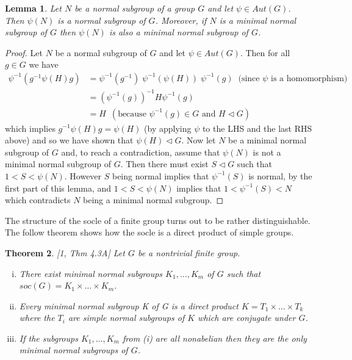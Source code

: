 \documentclass[]{article}
\newtheorem{thm}{Theorem}[section]
\newtheorem{lem}[thm]{Lemma}
\theoremstyle{definition}
\begin{document}
\begin{lem} \label{lem:minnor2}
Let $N$ be a normal subgroup of a group $G$ and let $\psi \in Aut(G)$. Then $\psi(N)$ is a normal subgroup of $G$. Moreover, if $N$ is a minimal normal subgroup of $G$ then $\psi(N)$ is also a minimal normal subgroup of $G$.
\end{lem}

\begin{proof}
Let $N$ be a normal subgroup of $G$ and let $\psi \in Aut(G)$. Then for all $g \in G$ we have
\begin{align*}
\psi^{-1}(g^{-1}\psi(H)g) & = \psi^{-1}(g^{-1}) \; \psi^{-1}(\psi(H)) \; \psi^{-1}(g) \;\; \mbox{(since } \psi \mbox{ is a homomorphism)} \\
 & = (\psi^{-1}(g))^{-1} H \psi^{-1}(g) \\
 & = H \:\; (\mbox{because } \psi^{-1}(g) \in G \mbox{ and } H \vartriangleleft G)
\end{align*}
which implies $g^{-1} \psi(H) g = \psi(H)$ (by applying $\psi$ to the LHS and the last RHS above) and so we have shown that $\psi(H) \vartriangleleft G$. Now let $N$ be a minimal normal subgroup of $G$ and, to reach a contradiction, assume that $\psi(N)$ is not a minimal normal subgroup of $G$. Then there must exist $S \vartriangleleft G$ such that $1 < S < \psi(N)$. However $S$ being normal implies that $\psi^{-1}(S)$ is normal, by the first part of this lemma, and $1 < S < \psi(N)$ implies that $1 < \psi^{-1}(S) < N$ which contradicts $N$ being a minimal normal subgroup.
\end{proof}

The structure of the socle of a finite group turns out to be rather distinguishable. The follow theorem shows how the socle is a direct product of simple groups.

\begin{thm} \label{thm:socle1} \emph{[1, Thm 4.3A]}
Let $G$ be a nontrivial finite group.
\begin{enumerate}[(i)]
\item There exist minimal normal subgroups $K_1, \dots, K_m$ of $G$ such that $soc(G) = K_1 \times \dots \times K_m$.
\vspace{-0.2cm} \item Every minimal normal subgroup K of G is a direct product $K = T_1 \times \dots \times T_k$ where the $T_i$ are simple normal subgroups of $K$ which are conjugate under $G$.
\vspace{-0.2cm} \item If the subgroups $K_1, \dots, K_m$ from (i) are all nonabelian then they are the only minimal normal subgroups of $G$. 
\end{enumerate}
\end{thm}
\end{document}
